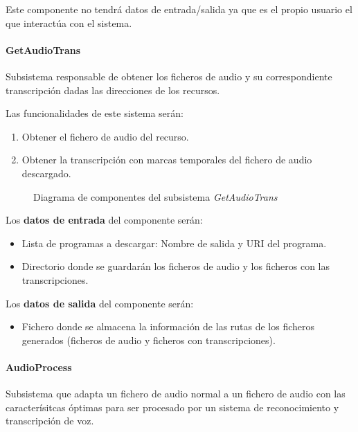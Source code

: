 \documentclass[../main.tex]{subfiles}
\begin{document}
Este componente no tendrá datos de entrada/salida ya que es el propio usuario el que interactúa con el sistema.

\paragraph{GetAudioTrans}\label{par:getaudiotrans}
Subsistema responsable de obtener los ficheros de audio y su correspondiente transcripción dadas las direcciones de los recursos.

Las funcionalidades de este sistema serán:
\begin{enumerate}
    \item Obtener el fichero de audio del recurso.
    \item Obtener la transcripción con marcas temporales del fichero de audio descargado.
\end{enumerate}

\begin{figure}[H]
    \centering
    
    \label{fig:components_getaudiotrans}
    \caption{Diagrama de componentes del subsistema \textit{GetAudioTrans}}
\end{figure}

Los \textbf{datos de entrada} del componente serán:
\begin{itemize}
    \item Lista de programas a descargar: Nombre de salida y \gls{URI} del programa.
    \item Directorio donde se guardarán los ficheros de audio y los ficheros con las transcripciones.
\end{itemize}

Los \textbf{datos de salida} del componente serán:
\begin{itemize}
    \item Fichero donde se almacena la información de las rutas de los ficheros generados (ficheros de audio y ficheros con transcripciones).
\end{itemize}

\paragraph{AudioProcess}\label{par:audioprocess}
Subsistema que adapta un fichero de audio normal a un fichero de audio con las caracterísitcas óptimas para ser procesado por un sistema de reconocimiento y transcripción de voz.
\end{document}
